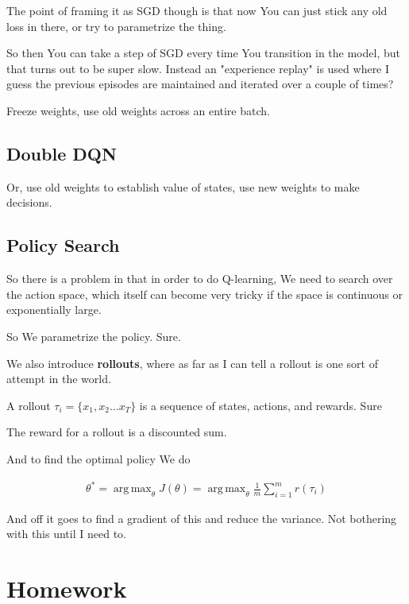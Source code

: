 \documentclass{article}
\DeclareMathOperator*{\argmax}{arg\,max}
\begin{document}
		The point of framing it as SGD though is that now You can just stick any old loss in there, or try to parametrize the thing. 
		
		So then You can take a step of SGD every time You transition in the model, but that turns out to be super slow. Instead an "experience replay" is used where I guess the previous episodes are maintained and iterated over a couple of times?
		
		Freeze weights, use old weights across an entire batch.
		
	\subsection{Double DQN}
	
		Or, use old weights to establish value of states, use new weights to make decisions.
		
	\subsection{Policy Search}
	
		So there is a problem in that in order to do Q-learning, We need to search over the action space, which itself can become very tricky if the space is continuous or exponentially large.
		
		So We parametrize the policy. Sure.
		
		We also introduce \textbf{rollouts}, where as far as I can tell a rollout is one sort of attempt in the world.
		
		A rollout $\tau_i = \{x_1, x_2\ldots x_T \}$ is a sequence of states, actions, and rewards. Sure
		
		The reward for a rollout is a discounted sum. 
		
		And to find the optimal policy We do
		
		\begin{align}
			\theta^* = \argmax_{\theta} J(\theta) = \argmax_{\theta} \frac{1}{m}\sum^m_{i=1} r(\tau_i)
		\end{align}
		
		And off it goes to find a gradient of this and reduce the variance. Not bothering with this until I need to.
		
		
		
		
		
		
\newpage

\section{Homework}
\end{document}
